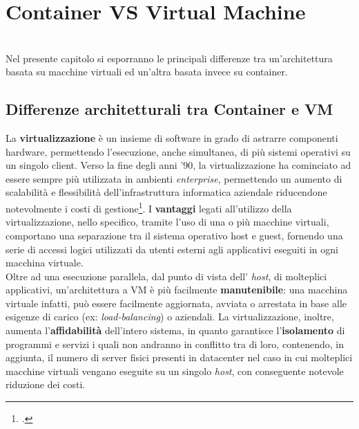 
\chapter{Container VS Virtual Machine}
\label{cap:container-vm}

\\
Nel presente capitolo si esporranno le principali differenze tra un'architettura basata su macchine virtuali ed un'altra basata invece su container.

\section{Differenze architetturali tra Container e VM}
La \textbf{virtualizzazione} è un insieme di software in grado di astrarre componenti \gls{hardware}, permettendo l'esecuzione, anche simultanea, di più \gls{sistemi operativi} su un singolo \gls{client}. Verso la fine degli anni '90, la virtualizzazione ha cominciato ad essere sempre più utilizzata in ambienti \textit{enterprise}, permettendo un aumento di scalabilità e flessibilità dell'infrastruttura informatica aziendale riducendone notevolmente i costi di gestione\footcite{fonte: https://www.vmware.com/it/solutions/virtualization.html}. I \textbf{vantaggi} legati all'utilizzo della virtualizzazione, nello specifico, tramite l'uso di una o più macchine virtuali, comportano una separazione tra il sistema operativo \gls{host} e \gls{guest}, fornendo una serie di accessi logici utilizzati da utenti esterni agli applicativi eseguiti in ogni macchina virtuale. \\
Oltre ad una esecuzione parallela, dal punto di vista dell' \textit{host}, di molteplici applicativi, un'architettura a VM è più facilmente \textbf{manutenibile}: una macchina virtuale infatti, può essere facilmente aggiornata, avviata o arrestata in base alle esigenze di carico (ex: \textit{load-balancing}) o aziendali.
La virtualizzazione, inoltre, aumenta l'\textbf{affidabilità} dell'intero sistema, in quanto garantisce l'\textbf{isolamento} di programmi e servizi i quali non andranno in conflitto tra di loro, contenendo, in aggiunta, il numero di server fisici presenti in \gls{datacenter} nel caso in cui molteplici macchine virtuali vengano eseguite su un singolo \textit{host}, con conseguente notevole riduzione dei costi.
